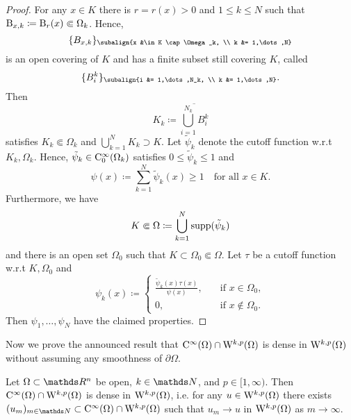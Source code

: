 \begin{proof}
  For any $x \in K$ there is $r = r(x) > 0$ and $1\leq k \leq N$ such that $\mathrm{B}_{x, k} \coloneqq \mathrm{B}_r(x) \Subset \Omega_k$.
  Hence, 
  $$
  \{B_{x,k}\}_{\subalign{x &\in K \cap \Omega_k, \\ k &= 1,\dots,N}}
  $$ 
  is an open covering of $K$ and has a finite subset still covering $K$, called 
  \[
  \{ B_i^k \}_{\subalign{i &= 1,\dots,N_k, \\ k &= 1,\dots,N}}.
  \]
  Then
  $$
  K_k \coloneqq \overline{\bigcup_{i = 1}^{N_k} B_i^k}
  $$
  satisfies $K_k \Subset \Omega_k$ and $\bigcup_{k = 1}^N K_k \supset K$.
  Let $\tilde \psi_k$ denote the cutoff function w.r.t $K_k, \Omega_k$.
  Hence, $\tilde \psi_k \in \mathrm{C}_0^\infty(\Omega_k)$ satisfies $0 \leq \tilde \psi_k \leq 1$ and
  $$
  \psi(x) \coloneqq \sum_{k = 1}^N \tilde \psi_k(x) \geq 1 \quad\text{for all } x \in K.
  $$
  Furthermore, we have
  $$
  K \Subset \Omega \coloneqq \bigcup_{k = 1}^N \operatorname{supp}(\tilde \psi_k)
  $$
  and there is an open set $\Omega_0$ such that $K \subset \Omega_0 \Subset \Omega$.
  Let $\tau$ be a cutoff function w.r.t $K, \Omega_0$ and
  $$
  \psi_k(x) \coloneqq \begin{cases} \frac{\tilde \psi_k(x) \tau(x)}{\psi(x)}, &\quad\text{if } x \in \Omega_0, \\ 0, &\quad \text{if } x \notin \Omega_0. \end{cases}
  $$
  Then $\psi_1,\dots,\psi_N$ have the claimed properties.
\end{proof}

Now we prove the announced result that $\mathrm{C}^\infty(\Omega) \cap \mathrm{W}^{k,p}(\Omega)$ is dense in $\mathrm{W}^{k,p}(\Omega)$ without assuming any smoothness of $\partial \Omega$.

\begin{thm}
  \label{thm:meyersSerrin}
  Let $\Omega \subset \R^n$ be open, $k \in \N$, and $p \in [1,\infty)$.
    Then $\mathrm{C}^\infty(\Omega) \cap \mathrm{W}^{k,p}(\Omega)$ is dense in $\mathrm{W}^{k,p}(\Omega)$, i.e. for any $u \in \mathrm{W}^{k,p}(\Omega)$ there exists $(u_m)_{m \in \N} \subset \CC^\infty(\Omega) \cap \WW^{k,p}(\Omega)$ such that $u_m \to u$ in $\mathrm{W}^{k,p}(\Omega)$ as $m \to \infty$.
\end{thm}

